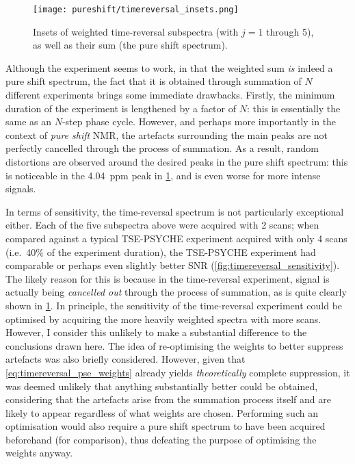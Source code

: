 \begin{figure}[htb]
    \centering
    \texttt{[image: pureshift/timereversal\_insets.png]}%
    \caption[Insets of time-reversal spectra]{
        Insets of weighted time-reversal subspectra (with $j = 1$ through 5), as well as their sum (the pure shift spectrum).
    }
    \label{fig:timereversal_insets}
\end{figure}

Although the experiment seems to work, in that the weighted sum \textit{is} indeed a pure shift spectrum, the fact that it is obtained through summation of $N$ different experiments brings some immediate drawbacks.
Firstly, the minimum duration of the experiment is lengthened by a factor of $N$: this is essentially the same as an $N$-step phase cycle.
However, and perhaps more importantly in the context of \textit{pure shift} NMR, the artefacts surrounding the main peaks are not perfectly cancelled through the process of summation.
As a result, random distortions are observed around the desired peaks in the pure shift spectrum: this is noticeable in the \qty{4.04}{ppm} peak in \cref{fig:timereversal_insets}, and is even worse for more intense signals.

In terms of sensitivity, the time-reversal spectrum is not particularly exceptional either.
Each of the five subspectra above were acquired with 2 scans; when compared against a typical TSE-PSYCHE experiment acquired with only 4 scans (i.e.\ 40\% of the experiment duration), the TSE-PSYCHE experiment had comparable or perhaps even slightly better SNR (\cref{fig:timereversal_sensitivity}).
The likely reason for this is because in the time-reversal experiment, signal is actually being \textit{cancelled out} through the process of summation, as is quite clearly shown in \cref{fig:timereversal_insets}.
In principle, the sensitivity of the time-reversal experiment could be optimised by acquiring the more heavily weighted spectra with more scans.
However, I consider this unlikely to make a substantial difference to the conclusions drawn here.
The idea of re-optimising the weights to better suppress artefacts was also briefly considered.
However, given that \cref{eq:timereversal_pse_weights} already yields \textit{theoretically} complete suppression, it was deemed unlikely that anything substantially better could be obtained, considering that the artefacts arise from the summation process itself and are likely to appear regardless of what weights are chosen.
Performing such an optimisation would also require a pure shift spectrum to have been acquired beforehand (for comparison), thus defeating the purpose of optimising the weights anyway.

